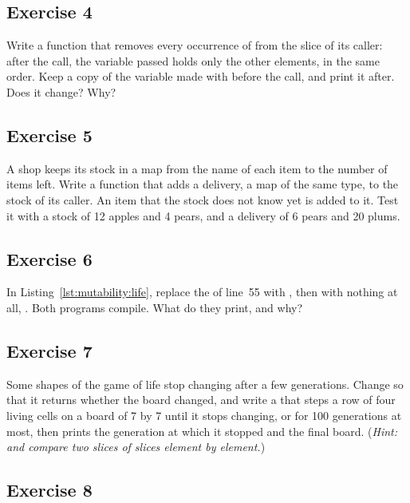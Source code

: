 \subsection*{Exercise 4}

Write a function  that
removes every occurrence of  from the slice of its caller: after
the call, the variable passed holds only the other elements, in the same order.
Keep a copy of the variable made with  before the
call, and print it after. Does it change? Why?

\subsection*{Exercise 5}

A shop keeps its stock in a map from the name of each item to the number of
items left. Write a function  that adds a delivery, a map of the
same type, to the stock of its caller. An item that the stock does not know yet
is added to it. Test it with a stock of 12 apples and 4 pears, and a delivery of
6 pears and 20 plums.

\subsection*{Exercise 6}

In Listing~\ref{lst:mutability:life}, replace the  of line~55 with
, then with nothing at all, . Both
programs compile. What do they print, and why?

\subsection*{Exercise 7}

Some shapes of the game of life stop changing after a few generations. Change
 so that it returns whether the board changed, and write a
 that steps a row of four living cells on a board of 7 by 7 until it
stops changing, or for 100 generations at most, then prints the generation at
which it stopped and the final board. (\textit{Hint: \token{==} and \token{!=}
  compare two slices of slices element by element.})

\subsection*{Exercise 8}

